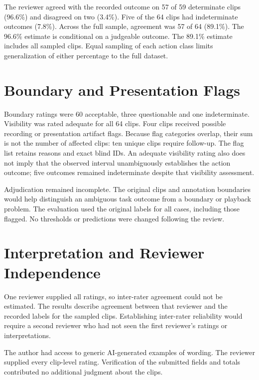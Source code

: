 The reviewer agreed with the recorded outcome on 57 of 59 determinate clips (96.6\%) and disagreed on two (3.4\%). Five of the 64 clips had indeterminate outcomes (7.8\%). Across the full sample, agreement was 57 of 64 (89.1\%). The 96.6\% estimate is conditional on a judgeable outcome. The 89.1\% estimate includes all sampled clips. Equal sampling of each action class limits generalization of either percentage to the full dataset.

\section{Boundary and Presentation Flags}

Boundary ratings were 60 acceptable, three questionable and one indeterminate. Visibility was rated adequate for all 64 clips. Four clips received possible recording or presentation artifact flags. Because flag categories overlap, their sum is not the number of affected clips: ten unique clips require follow-up. The flag list retains reasons and exact blind IDs. An adequate visibility rating also does not imply that the observed interval unambiguously establishes the action outcome; five outcomes remained indeterminate despite that visibility assessment.

Adjudication remained incomplete. The original clips and annotation boundaries would help distinguish an ambiguous task outcome from a boundary or playback problem. The evaluation used the original labels for all cases, including those flagged. No thresholds or predictions were changed following the review.

\section{Interpretation and Reviewer Independence}

One reviewer supplied all ratings, so inter-rater agreement could not be estimated. The results describe agreement between that reviewer and the recorded labels for the sampled clips. Establishing inter-rater reliability would require a second reviewer who had not seen the first reviewer's ratings or interpretations.

The author had access to generic AI-generated examples of wording. The reviewer supplied every clip-level rating. Verification of the submitted fields and totals contributed no additional judgment about the clips.
